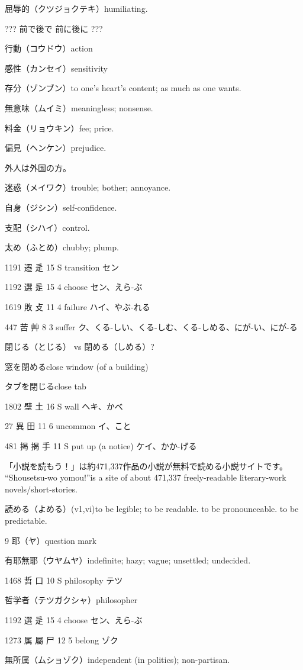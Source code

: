 屈辱的（クツジョクテキ）humiliating.

???
前で後で
前に後に
???

行動（コウドウ）action

感性（カンセイ）sensitivity

存分（ゾンブン）to one's heart's content; as much as one wants.

無意味（ムイミ）meaningless; nonsense.

料金（リョウキン）fee; price.

偏見（ヘンケン）prejudice.

外人は外国の方。

迷惑（メイワク）trouble; bother; annoyance.

自身（ジシン）self-confidence.

支配（シハイ）control.

太め（ふとめ）chubby; plump.

1191	遷		辵	15	S		transition	セン

1192	選		辵	15	4		choose	セン、えら-ぶ

1619	敗		攴	11	4		failure	ハイ、やぶ-れる

447	苦		艸	8	3		suffer	ク、くる-しい、くる-しむ、くる-しめる、にが-い、にが-る

閉じる（とじる） vs 閉める（しめる）?

窓を閉めるclose window (of a building)

タブを閉じるclose tab

1802	壁		土	16	S		wall	ヘキ、かべ

27	異		田	11	6		uncommon	イ、こと

481	掲	揭	手	11	S		put up (a notice)	ケイ、かか-げる

「小説を読もう！」は約471,337作品の小説が無料で読める小説サイトです。
``Shousetsu-wo yomou!''is a site of about 471,337 freely-readable literary-work novels/short-stories.

読める（よめる）(v1,vi)to be legible; to be readable.
to be pronounceable.
to be predictable.

9 耶（ヤ）question mark

有耶無耶（ウヤムヤ）indefinite; hazy; vague; unsettled; undecided.

1468	哲		口	10	S		philosophy	テツ

哲学者（テツガクシャ）philosopher

1192	選		辵	15	4		choose	セン、えら-ぶ

1273	属	屬	尸	12	5		belong	ゾク

無所属（ムショゾク）independent (in politics); non-partisan.

